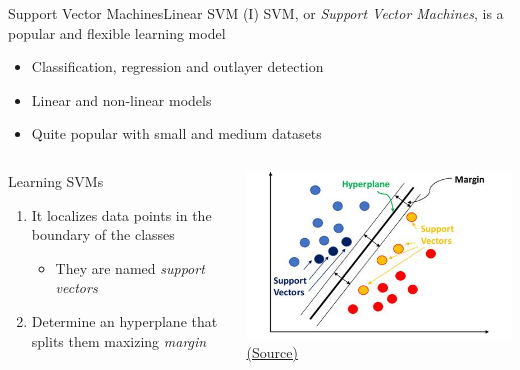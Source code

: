 \documentclass[10pt,compress]{beamer} %
\begin{document}
\begin{frame}{Support Vector Machines}{Linear SVM (I)}
    \alert{SVM}, or \textit{Support Vector Machines}, is a popular and flexible learning model
    \begin{itemize}
        \item Classification, regression and outlayer detection
        \item Linear and non-linear models
        \item Quite popular with small and medium datasets
    \end{itemize}

    \begin{columns}
            \begin{block}{Learning SVMs}
            \begin{enumerate}
               \item It localizes data points in the boundary of the classes
               \begin{itemize}
                  \item They are named \textit{support vectors}
               \end{itemize}
               \item Determine an hyperplane that splits them maxizing \textit{margin}
            \end{enumerate}
            \end{block}

            \includegraphics[width=\linewidth]{figs/svm.jpeg}\\
            \centering\tiny{\href{https://www.researchgate.net/figure/Support-Vector-Machine-visualization_fig5_332248436}{(Source)}}
    \end{columns}
\end{frame}
\end{document}
